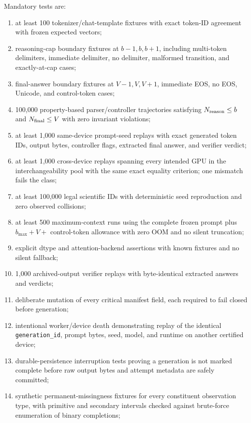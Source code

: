 \documentclass[11pt,a4paper]{article}
\begin{document}
Mandatory tests are:
\begin{enumerate}
\item at least 100 tokenizer/chat-template fixtures with exact token-ID agreement with frozen expected vectors;
\item reasoning-cap boundary fixtures at $b-1,b,b+1$, including multi-token delimiters, immediate delimiter, no delimiter, malformed transition, and exactly-at-cap cases;
\item final-answer boundary fixtures at $V-1,V,V+1$, immediate EOS, no EOS, Unicode, and control-token cases;
\item 100,000 property-based parser/controller trajectories satisfying $N_{\rm reason}\le b$ and $N_{\rm final}\le V$ with zero invariant violations;
\item at least 1,000 same-device prompt-seed replays with exact generated token IDs, output bytes, controller flags, extracted final answer, and verifier verdict;
\item at least 1,000 cross-device replays spanning every intended GPU in the interchangeability pool with the same exact equality criterion; one mismatch fails the class;
\item at least 100,000 legal scientific IDs with deterministic seed reproduction and zero observed collisions;
\item at least 500 maximum-context runs using the complete frozen prompt plus $b_{\max}+V+$ control-token allowance with zero OOM and no silent truncation;
\item explicit dtype and attention-backend assertions with known fixtures and no silent fallback;
\item 1,000 archived-output verifier replays with byte-identical extracted answers and verdicts;
\item deliberate mutation of every critical manifest field, each required to fail closed before generation;
\item intentional worker/device death demonstrating replay of the identical \texttt{generation\_id}, prompt bytes, seed, model, and runtime on another certified device;
\item durable-persistence interruption tests proving a generation is not marked complete before raw output bytes and attempt metadata are safely committed;
\item synthetic permanent-missingness fixtures for every constituent observation type, with primitive and secondary intervals checked against brute-force enumeration of binary completions;

\end{enumerate}
\end{document}
